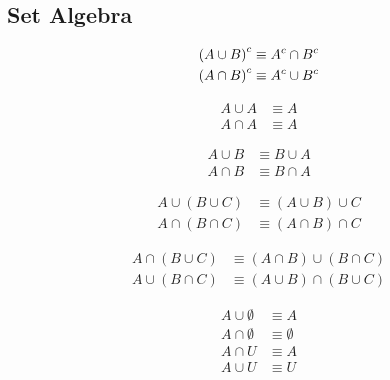 \subsection{Set Algebra}
\begin{definition}
\begin{align}
    {(A \cup B)}^{c} &\equiv {A}^{c} \cap {B}^{c} \\
    {(A \cap B)}^{c} &\equiv {A}^{c} \cup {B}^{c}
\end{align}
\end{definition}

\begin{definition}
\begin{align}
    A \cup A &\equiv A \\
    A \cap A &\equiv A
\end{align}
\end{definition}

\begin{definition}
\begin{align}
    A \cup B &\equiv B \cup A \\
    A \cap B &\equiv B \cap A
\end{align}
\end{definition}

\begin{definition}
\begin{align}
    A \cup (B \cup C) &\equiv (A \cup B) \cup C \\
    A \cap (B \cap C) &\equiv (A \cap B) \cap C
\end{align}
\end{definition}

\begin{definition}
\begin{align}
    A \cap (B \cup C) &\equiv (A \cap B) \cup (B \cap C)\\
    A \cup (B \cap C) &\equiv (A \cup B) \cap (B \cup C)
\end{align}
\end{definition}

\begin{definition}
\begin{align}
    A \cup \emptyset &\equiv A \\
    A \cap \emptyset &\equiv \emptyset \\
    A \cap U &\equiv A \\
    A \cup U &\equiv U
\end{align}
\end{definition}

